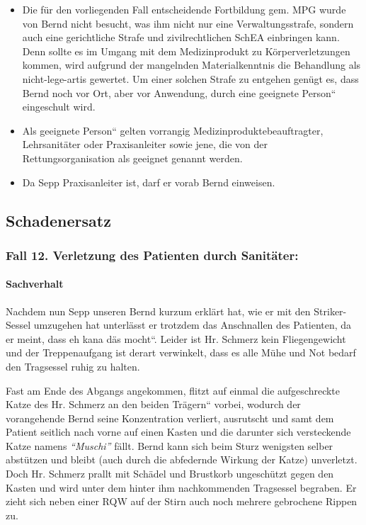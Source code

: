 \begin{itemize}
	\item {\mdseries\color[rgb]{0.0,0.0,0.5019608}
	Die f\"ur den vorliegenden Fall entscheidende Fortbildung gem. MPG wurde
	von Bernd nicht besucht, was ihm nicht nur eine Verwaltungsstrafe,
	sondern auch eine gerichtliche Strafe und zivilrechtlichen SchEA
	einbringen kann. Denn sollte es im Umgang mit dem Medizinprodukt zu
	K\"orperverletzungen kommen, wird aufgrund der mangelnden
	Materialkenntnis die Behandlung als nicht-lege-artis gewertet. Um einer
	solchen Strafe zu entgehen gen\"ugt es, dass Bernd noch vor Ort, aber
	vor Anwendung, durch eine {\quotedblbase}geeignete
	Person{\textquotedblleft} eingeschult wird. }

	\item {\mdseries\color[rgb]{0.0,0.0,0.5019608}
	Als {\quotedblbase}geeignete Person{\textquotedblleft} gelten vorrangig
	Medizinproduktebeauftragter,  Lehrsanitäter oder Praxisanleiter sowie
	jene, die von der Rettungsorganisation als geeignet genannt werden.}

	\item {\mdseries\color[rgb]{0.0,0.0,0.5019608}
	Da Sepp Praxisanleiter ist, darf er vorab Bernd einweisen.}

\end{itemize}

\subsection{Schadenersatz}

\subsubsection{Fall 12. Verletzung des Patienten durch
Sanitäter:}

\paragraph*{Sachverhalt}

Nachdem nun Sepp unseren Bernd kurzum erklärt hat, wie er mit den
Striker-Sessel umzugehen hat unterlässt er trotzdem das Anschnallen
des Patienten, da er meint, dass {\quotedblbase}eh kana däs
mocht{\textquotedblleft}. Leider ist Hr. Schmerz kein Fliegengewicht
und der Treppenaufgang ist derart verwinkelt, dass es alle M\"uhe und
Not bedarf den Tragsessel ruhig zu halten. 

Fast am Ende des Abgangs angekommen, flitzt auf einmal die
aufgeschreckte Katze des Hr. Schmerz an den beiden
{\quotedblbase}Trägern{\textquotedblleft} vorbei, wodurch der
vorangehende Bernd seine Konzentration verliert, ausrutscht und samt
dem Patient seitlich nach vorne auf einen Kasten und die
darunter sich versteckende Katze namens \emph{"`Muschi"'}
fällt. Bernd kann sich beim Sturz wenigsten selber abst\"utzen und bleibt (auch durch die abfedernde Wirkung der Katze)
unverletzt. Doch Hr. Schmerz prallt mit Schädel und Brustkorb
ungesch\"utzt gegen den Kasten und wird unter dem hinter ihm
nachkommenden Tragsessel begraben. Er zieht sich neben einer RQW auf
der Stirn auch noch mehrere gebrochene Rippen zu. 


